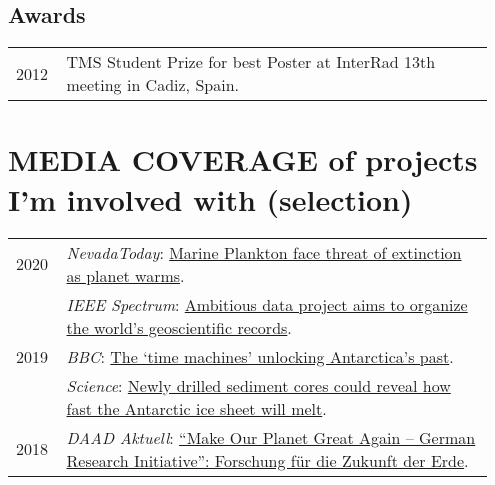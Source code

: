 \documentclass[11pt, a4paper]{article}
\begin{document}
\subsection{Awards}
\begin{longtable}{@{}p{0.1\linewidth} P{0.85\linewidth}@{}}
2012 & TMS Student Prize for best Poster at InterRad 13th meeting in Cadiz, Spain.\\
\end{longtable}

\section[MEDIA COVERAGE]{MEDIA COVERAGE \textnormal{\footnotesize{ of projects I'm involved with (selection)}}}
\begin{longtable}{@{}p{0.1\linewidth} P{0.85\linewidth}@{}}
2020 & \emph{NevadaToday}: \href{https://www.unr.edu/nevada-today/news/2020/marine-plankton}{Marine Plankton face threat of extinction as planet warms}.\\
 & \emph{IEEE Spectrum}: \href{https://spectrum.ieee.org/computing/software/ambitious-data-project-aims-to-organize-the-worlds-geoscientific-records}{Ambitious data project aims to organize the world’s geoscientific records}.\\
2019 & \emph{BBC}: \href{https://www.bbc.com/reel/video/p07bvx51/the-time-machines-unlocking-antarctica-s-past}{The `time machines' unlocking Antarctica's past}.\\
  & \emph{Science}: \href{http://dx.doi.org/10.1126/science.aax7040}{Newly drilled sediment cores could reveal how fast the Antarctic ice sheet will melt}.\\
2018 & \emph{DAAD Aktuell}: \href{https://www.daad.de/der-daad/daad-aktuell/de/66800-make-our-planet-great-again-german-research-initiative-forschung-fuer-die-zukunft-der-erde/}{``Make Our Planet Great Again -- German Research Initiative'': Forschung für die Zukunft der Erde}.\\
\end{longtable}
\end{document}
